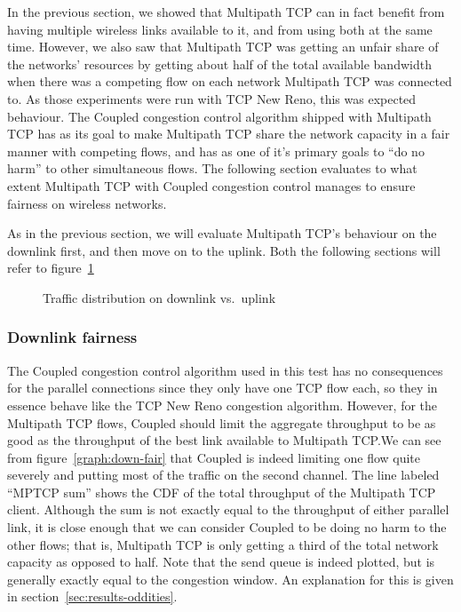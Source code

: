 In the previous section, we showed that Multipath TCP can in fact benefit from
having multiple wireless links available to it, and from using both at the same
time. However, we also saw that Multipath TCP was getting an unfair share of the
networks' resources by getting about half of the total available bandwidth when
there was a competing flow on each network Multipath TCP was connected to. As
those experiments were run with TCP New Reno, this was expected behaviour. The
Coupled congestion control algorithm shipped with Multipath TCP has as its goal
to make Multipath TCP share the network capacity in a fair manner with competing
flows, and has as one of it's primary goals to ``do no harm'' to other
simultaneous flows. The following section evaluates to what extent Multipath TCP
with Coupled congestion control manages to ensure fairness on wireless networks.

As in the previous section, we will evaluate Multipath TCP's behaviour on the
downlink first, and then move on to the uplink. Both the following sections will
refer to figure~\ref{graph:fairness}

\begin{figure}[h]
 \centering
 \subfloat[][downlink] {\
   \scalebox{0.55}{}\label{graph:down-fair}
 }
 \subfloat[][uplink] {\
   \scalebox{0.55}{}\label{graph:up-fair}
 }

 \caption{Traffic distribution on downlink vs.\ uplink}\label{graph:fairness}
\end{figure}

\subsubsection{Downlink fairness}
The Coupled congestion control algorithm used in this test has no consequences
for the parallel connections since they only have one TCP flow each, so they
in essence behave like the TCP New Reno congestion algorithm. However, for the
Multipath TCP flows, Coupled should limit the aggregate throughput to be as good
as the throughput of the best link available to Multipath TCP.\@ We can see from
figure~\ref{graph:down-fair} that Coupled is indeed limiting one flow quite
severely and putting most of the traffic on the second channel. The line labeled
``MPTCP sum'' shows the CDF of the total throughput of the Multipath TCP client.
Although the sum is not exactly equal to the throughput of either parallel link,
it is close enough that we can consider Coupled to be doing no harm to the other
flows; that is, Multipath TCP is only getting a third of the total network
capacity as opposed to half. Note that the send queue is indeed plotted, but is
generally exactly equal to the congestion window. An explanation for this is
given in section~\ref{sec:results-oddities}.

